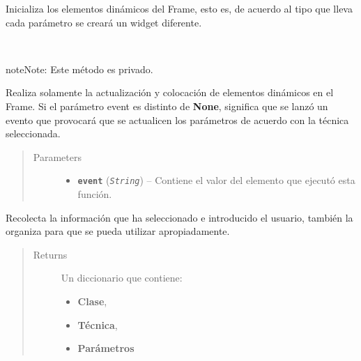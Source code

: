 \documentclass[class=report, crop=false]{standalone}
\begin{document}
\begin{fulllineitems}
\begin{fulllineitems}
Inicializa los elementos dinámicos del Frame, esto es, de acuerdo 
al tipo que lleva cada parámetro se creará un widget diferente.

\end{fulllineitems}

\begin{fulllineitems}

~

\begin{notice}{note}{Note:}
Este método es privado.
\end{notice}

Realiza solamente la actualización y colocación de elementos dinámicos 
en el Frame.\break
Si el parámetro event es distinto de \textbf{None}, significa que se 
lanzó un evento que provocará que se actualicen los parámetros de 
acuerdo con la técnica seleccionada.

\begin{quote}\begin{description}
\item[{Parameters}] \leavevmode\begin{itemize}
\item \textbf{\texttt{event}} (\emph{\texttt{String}}) -- Contiene el valor del elemento que ejecutó esta función.
\end{itemize}
\end{description}\end{quote}

\end{fulllineitems}

\begin{fulllineitems}

Recolecta la información que ha seleccionado e introducido 
el usuario, también la organiza para que se pueda utilizar 
apropiadamente.

\begin{quote}\begin{description}
\item[{Returns}] \leavevmode

Un diccionario que contiene:

\begin{itemize}
\item \textbf{Clase},
\item \textbf{Técnica},
\item \textbf{Parámetros}
\end{itemize}


\end{description}
\end{quote}
\end{fulllineitems}
\end{fulllineitems}
\end{document}
